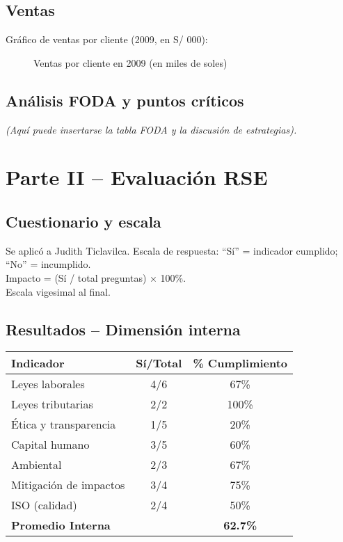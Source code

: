\documentclass[a4paber,12pt]{article}
\begin{document}
	\subsection{Ventas}
	Gráfico de ventas por cliente (2009, en S/ 000):
	
	\begin{figure}[h!]
		\centering
		\caption{Ventas por cliente en 2009 (en miles de soles)}
	\end{figure}
	
	\subsection{Análisis FODA y puntos críticos}
	\textit{(Aquí puede insertarse la tabla FODA y la discusión de estrategias).}
	
	\section{Parte II – Evaluación RSE}
	
	\subsection{Cuestionario y escala}
	Se aplicó a Judith Ticlavilca. Escala de respuesta: “Sí” = indicador cumplido; “No” = incumplido.\\
	Impacto = (Sí / total preguntas) × 100\%.\\
	Escala vigesimal al final.
	
	\subsection{Resultados – Dimensión interna}
	
	\begin{center}
		\begin{tabular}{|l|c|c|}
			\hline
			\textbf{Indicador} & \textbf{Sí/Total} & \textbf{\% Cumplimiento} \\
			\hline
			Leyes laborales & 4/6 & 67\% \\
			Leyes tributarias & 2/2 & 100\% \\
			Ética y transparencia & 1/5 & 20\% \\
			Capital humano & 3/5 & 60\% \\
			Ambiental & 2/3 & 67\% \\
			Mitigación de impactos & 3/4 & 75\% \\
			ISO (calidad) & 2/4 & 50\% \\
			\hline
			\textbf{Promedio Interna} & & \textbf{62.7\%} \\
			\hline
		\end{tabular}
	\end{center}
	
\end{document}

